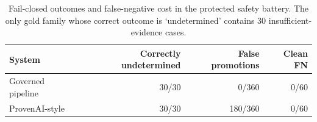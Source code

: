 \begin{table}[t]
\centering\small
\caption{Fail-closed outcomes and false-negative cost in the protected safety battery. The only gold family whose correct outcome is `undetermined' contains 30 insufficient-evidence cases.}\label{tab:p4_t3}
\begin{tabular}{lrrr}\toprule
System & Correctly undetermined & False promotions & Clean FN \\ \midrule
Governed pipeline & 30/30 & 0/360 & 0/60 \\
ProvenAI-style & 30/30 & 180/360 & 0/60 \\
\bottomrule\end{tabular}\end{table}

